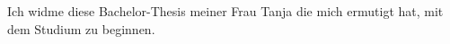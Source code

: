 \documentclass[11pt,a4paper]{article}
\begin{document}
Ich widme diese Bachelor-Thesis meiner Frau Tanja die mich ermutigt hat, mit dem Studium zu beginnen.

\pagebreak



\pagebreak

\tableofcontents

\pagebreak

\setcounter{page}{1}



\pagebreak



\pagebreak



\pagebreak









\pagebreak


\end{document}
